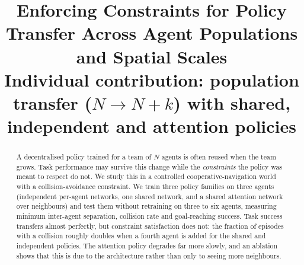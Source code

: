 \documentclass[11pt,a4paper]{article}
\title{\textbf{Enforcing Constraints for Policy Transfer Across Agent Populations and Spatial Scales}\\[2pt]
\large Individual contribution: population transfer ($N\to N{+}k$) with shared, independent and attention policies}
\begin{document}
\maketitle

\begin{abstract}
\noindent
A decentralised policy trained for a team of $N$ agents is often reused when the team grows. Task performance may
survive this change while the \emph{constraints} the policy was meant to respect do not. We study this in a controlled
cooperative-navigation world with a collision-avoidance constraint. We train three policy families on three agents
(independent per-agent networks, one shared network, and a shared attention network over neighbours) and test them
without retraining on three to six agents, measuring minimum inter-agent separation, collision rate and goal-reaching
success. Task success transfers almost perfectly, but constraint satisfaction does not: the fraction of episodes with a
collision roughly doubles when a fourth agent is added for the shared and independent policies. The attention policy
degrades far more slowly, and an ablation shows that this is due to the architecture rather than only to seeing more
neighbours.
\end{abstract}





\end{document}
